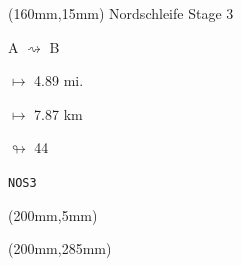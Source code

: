 \begin{textblock*}{40mm}(160mm,15mm)%
Nordschleife Stage 3
\par A $\rightsquigarrow$ B
\Large
\par$\mapsto$ 4.89 mi.
\par$\mapsto$ 7.87 km
\par$\looparrowright$ 44
\par\hfill\tiny\tt NOS3\\
\end{textblock*}
\begin{textblock*}{20mm}(200mm,5mm)%
\fbox{\thepage}
\end{textblock*}
\begin{textblock*}{20mm}(200mm,285mm)%
\fbox{\thepage}
\end{textblock*}
\null\newpage


